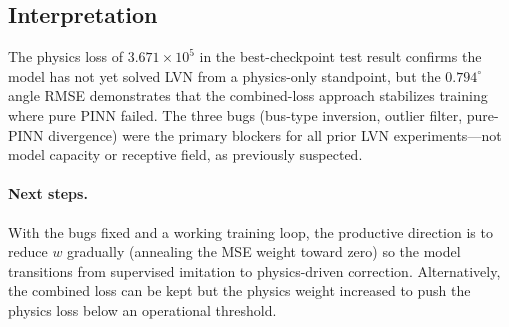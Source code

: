 \documentclass{article}
\begin{document}
\subsection{Interpretation}

The physics loss of $3.671\times10^5$ in the best-checkpoint test result
confirms the model has not yet solved LVN from a physics-only standpoint,
but the $0.794^\circ$ angle RMSE demonstrates that the combined-loss
approach stabilizes training where pure PINN failed.  The three bugs
(bus-type inversion, outlier filter, pure-PINN divergence) were the primary
blockers for all prior LVN experiments---not model capacity or receptive
field, as previously suspected.

\paragraph{Next steps.}
With the bugs fixed and a working training loop, the productive direction
is to reduce $w$ gradually (annealing the MSE weight toward zero) so the
model transitions from supervised imitation to physics-driven correction.
Alternatively, the combined loss can be kept but the physics weight
increased to push the physics loss below an operational threshold.
\end{document}
